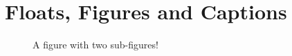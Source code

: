 \section{Floats, Figures and Captions} %
\label{sec:floats_figures_and_captions}

% 
% 
% 
% 



\lipsum[1-3]

\begin{figure}[htbp]
\centering
\caption{A figure with two sub-figures!}
\label{fig:fig2subfig}
\end{figure}

